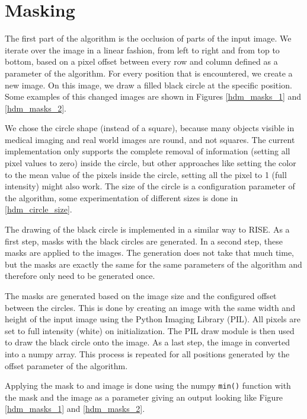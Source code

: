 \section{Masking}

The first part of the algorithm is the occlusion of parts of the input image.
We iterate over the image in a linear fashion, from left to right and from top to bottom, based on a pixel offset between every row and column defined as a parameter of the algorithm.
For every position that is encountered, we create a new image. On this image, we draw a filled black circle at the specific position.
Some examples of this changed images are shown in Figures \ref{hdm_masks_1} and \ref{hdm_masks_2}.

We chose the circle shape (instead of a square), because many objects visible in medical imaging and real world images are round, and not squares.
The current implementation only supports the complete removal of information (setting all pixel values to zero) inside the circle, but other approaches like
setting the color to the mean value of the pixels inside the circle, setting all the pixel to 1 (full intensity) might also work.
The size of the circle is a configuration parameter of the algorithm, some experimentation of different sizes is done in \autoref{hdm_circle_size}.

The drawing of the black circle is implemented in a similar way to RISE. As a first step, masks with the black circles are generated. In a second step,
these masks are applied to the images. The generation does not take that much time, but the masks are exactly the same for the same parameters of the algorithm and therefore
only need to be generated once.

The masks are generated based on the image size and the configured offset between the circles.
This is done by creating an image with the same width and height of the input image using the Python Imaging Library (PIL). All pixels are set to full intensity (white) on initialization.
The PIL draw module is then used to draw the black circle onto the image. As a last step, the image in converted into a numpy array. This process is repeated for all positions generated
by the offset parameter of the algorithm.

Applying the mask to and image is done using the numpy \texttt{min()} function with the mask and the image as a parameter giving an output looking like Figure \ref{hdm_masks_1} and \ref{hdm_masks_2}.

